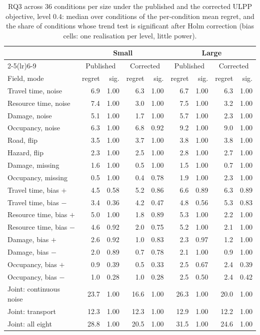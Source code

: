 \begin{table}[h]
\centering
\caption{RQ3 across $36$ conditions per size under the published and the corrected ULPP objective, level $0.4$: median over conditions of the per-condition mean regret, and the share of conditions whose trend test is significant after Holm correction (bias cells: one realisation per level, little power).}\label{tab:s-extended}
\scriptsize
\setlength{\tabcolsep}{3pt}
\begin{tabular}{l rrrr rrrr}
\toprule
& \multicolumn{4}{c}{Small} & \multicolumn{4}{c}{Large}\\
\cmidrule(lr){2-5}\cmidrule(lr){6-9}
& \multicolumn{2}{c}{Published} & \multicolumn{2}{c}{Corrected} & \multicolumn{2}{c}{Published} & \multicolumn{2}{c}{Corrected}\\
Field, mode & regret & sig. & regret & sig. & regret & sig. & regret & sig.\\
\midrule
Travel time, noise & 6.9 & 1.00 & 6.3 & 1.00 & 6.7 & 1.00 & 6.3 & 1.00\\
Resource time, noise & 7.4 & 1.00 & 3.0 & 1.00 & 7.5 & 1.00 & 3.2 & 1.00\\
Damage, noise & 5.1 & 1.00 & 1.7 & 1.00 & 5.7 & 1.00 & 2.3 & 1.00\\
Occupancy, noise & 6.3 & 1.00 & 6.8 & 0.92 & 9.2 & 1.00 & 9.0 & 1.00\\
Road, flip & 3.5 & 1.00 & 3.7 & 1.00 & 3.8 & 1.00 & 3.8 & 1.00\\
Hazard, flip & 2.3 & 1.00 & 2.5 & 1.00 & 2.8 & 1.00 & 2.7 & 1.00\\
Damage, missing & 1.6 & 1.00 & 0.5 & 1.00 & 1.5 & 1.00 & 0.7 & 1.00\\
Occupancy, missing & 0.5 & 1.00 & 0.4 & 0.78 & 1.9 & 1.00 & 2.3 & 1.00\\
Travel time, bias $+$ & 4.5 & 0.58 & 5.2 & 0.86 & 6.6 & 0.89 & 6.3 & 0.89\\
Travel time, bias $-$ & 3.4 & 0.36 & 4.2 & 0.47 & 4.8 & 0.56 & 5.3 & 0.83\\
Resource time, bias $+$ & 5.0 & 1.00 & 1.8 & 0.89 & 5.3 & 1.00 & 2.2 & 1.00\\
Resource time, bias $-$ & 4.6 & 0.92 & 2.0 & 0.75 & 5.2 & 1.00 & 2.1 & 1.00\\
Damage, bias $+$ & 2.6 & 0.92 & 1.0 & 0.83 & 2.3 & 0.97 & 1.2 & 1.00\\
Damage, bias $-$ & 2.0 & 0.89 & 0.7 & 0.78 & 2.1 & 1.00 & 0.9 & 1.00\\
Occupancy, bias $+$ & 0.9 & 0.39 & 0.5 & 0.33 & 2.5 & 0.67 & 2.4 & 0.39\\
Occupancy, bias $-$ & 1.0 & 0.28 & 1.0 & 0.28 & 2.5 & 0.50 & 2.4 & 0.42\\
Joint: continuous noise & 23.7 & 1.00 & 16.6 & 1.00 & 26.3 & 1.00 & 20.0 & 1.00\\
Joint: transport & 12.3 & 1.00 & 12.3 & 1.00 & 12.9 & 1.00 & 12.2 & 1.00\\
Joint: all eight & 28.8 & 1.00 & 20.5 & 1.00 & 31.5 & 1.00 & 24.6 & 1.00\\
\bottomrule
\end{tabular}
\end{table}
